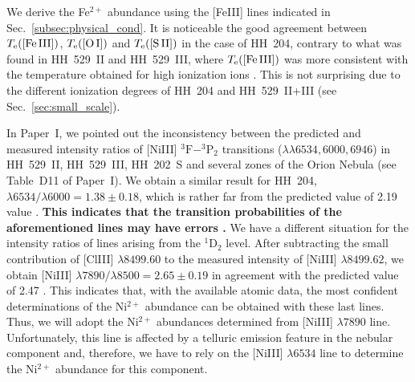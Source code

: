 \documentclass[twocolumn,linenumbers]{aastex63}
\newcommand{\eduardo}[1]{{\color{teal}E: #1}}
\newcommand{\Karla}[1]{{\color{violet}K: #1}}
\begin{document}
We derive the Fe$^{2+}$ abundance using the [Fe\thinspace III] lines indicated in Sec.~\ref{subsec:physical_cond}. It is noticeable the good agreement between $T_{\rm e}(\text{[Fe\thinspace III]})$, $T_{\rm e}(\text{[O\thinspace I]})$ and $T_{\rm e}(\text{[S\thinspace II]})$ in the case of HH~204, contrary to what was found in HH~529~II and HH~529~III, where $T_{\rm e}(\text{[Fe\thinspace III]})$ was more consistent with the temperature obtained for high ionization ions \citep{mendez2021}. This is not surprising due to the different ionization degrees of HH~204 and HH~529~II+III (see Sec.~\ref{sec:small_scale}). 

In Paper~I, we pointed out the inconsistency between the predicted and measured intensity ratios of [Ni\thinspace III] $^3\text{F}-^3\text{P}_2$ transitions ($\lambda \lambda 6534, 6000, 6946$) in HH~529~II, HH~529~III, HH~202~S and several zones of the Orion Nebula (see Table~D11 of Paper~I). We obtain a similar result for HH~204, $\lambda 6534/\lambda6000=1.38\pm 0.18$, which is rather far from the predicted value of 2.19 value \citep[][]{Bautista01}. {\bf This indicates that the transition probabilities of the aforementioned lines may have errors \citep[for a more detailed discussion see Appendix C in][]{mendez2021}.} We have a different situation for the intensity ratios of lines arising from the $^{1}\text{D}_2$ level. After subtracting the small contribution of [Cl\thinspace III] $\lambda 8499.60$ to the measured intensity of  [Ni\thinspace III] $\lambda 8499.62$, we obtain [Ni\thinspace III] $\lambda7890/\lambda8500=2.65\pm 0.19$ in agreement with the predicted value of 2.47 \citep{Bautista01}. This indicates that, with the available atomic data, the most confident determinations of the Ni$^{2+}$ abundance can be obtained with these last lines. Thus, we will adopt the  Ni$^{2+}$ abundances determined from  [Ni\thinspace III] $\lambda 7890$ line.  Unfortunately, this line is affected by a telluric emission feature in the nebular component and, therefore, we have to rely on the [Ni\thinspace III] $\lambda6534$ line to determine the Ni$^{2+}$ abundance for this component. %
\end{document}
